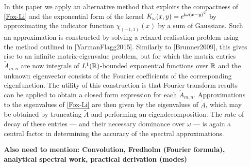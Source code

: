 In this paper we apply an alternative method that exploits the compactness of \eqref{Fox-Li} and the exponential form of the kernel $K_\omega(x, y) = e^{\text{i}\omega(x - y)^2}$ by approximating the indicator function $\chi_{(-1, 1)}(x)$ by a sum of Gaussians. Such an approximation is constructed by solving a relaxed realisation problem using the method outlined in [YarmanFlagg2015]. Similarly to [Brunner2009], this gives rise to an infinite matrix-eigenvalue problem, but for which the matrix entries $\tilde{A}_{m, n}$ are now integrals of $L^1(\mathbb{R})$-bounded exponential functions over $\mathbb{R}$ and the unknown eigenvector consists of the Fourier coefficients of the corresponding eigenfunction. The utility of this construction is that Fourier transform results can be applied to obtain a closed form expression for each $\tilde{A}_{m, n}$. Approximations to the eigenvalues of \eqref{Fox-Li} are then given by the eigenvalues of $\tilde{A}$, which may be obtained by truncating $\tilde{A}$ and performing an eigendecomposition. The rate of decay of these entries --- and their necessary dominance over $\omega$ ---  is again a central factor in determining the accuracy of the spectral approximations.








\textbf{Also need to mention: Convolution, Fredholm (Fourier formula), analytical spectral work, practical derivation (modes)}